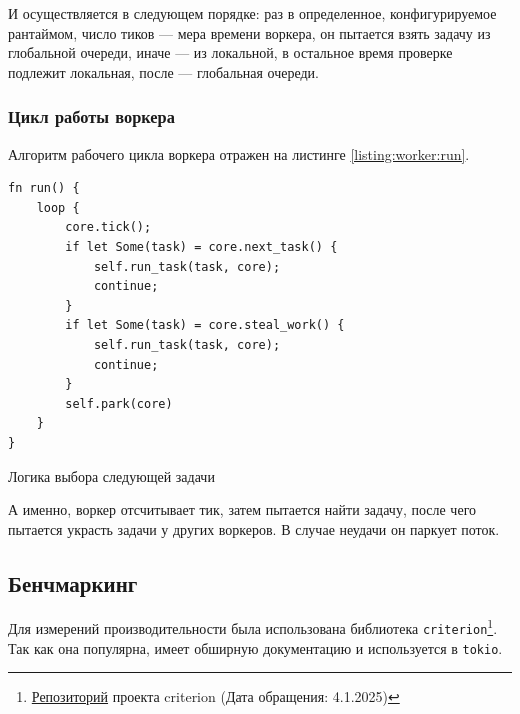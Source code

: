 И осуществляется в следующем порядке: раз в определенное, конфигурируемое рантаймом, число тиков --- мера времени воркера, он пытается взять задачу из глобальной очереди, иначе --- из локальной, в остальное время проверке подлежит локальная, после --- глобальная очереди.

\subsubsection{Цикл работы воркера}

Алгоритм рабочего цикла воркера отражен на листинге \ref{listing:worker:run}.

\begin{listing}[H]
    \begin{verbatim}
fn run() {
    loop {
        core.tick();
        if let Some(task) = core.next_task() {
            self.run_task(task, core);
            continue;
        }
        if let Some(task) = core.steal_work() {
            self.run_task(task, core);
            continue;
        }
        self.park(core)
    }
}
    \end{verbatim}

    \caption{Логика выбора следующей задачи}
    \label{listing:worker:run}
\end{listing}

А именно, воркер отсчитывает тик, затем пытается найти задачу, после чего пытается украсть задачи у других воркеров. В случае неудачи он паркует поток.

\subsection{Бенчмаркинг}

Для измерений производительности была использована библиотека \verb|criterion|\footnote{\href{https://github.com/bheisler/criterion.rs}{Репозиторий} проекта criterion (Дата обращения: 4.1.2025)}. Так как она популярна, имеет обширную документацию и используется в \verb|tokio|.
